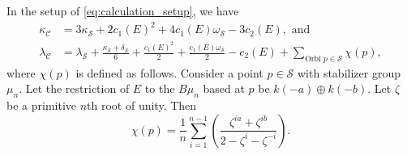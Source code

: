 \documentclass{amsart}
\newcommand{\orb}[1]{{\mathcal #1}}     %
\begin{document}
\begin{proposition}\label{thm:kappa-lambda}
  In the setup of \eqref{eq:calculation_setup}, we have
\begin{align*}
    \kappa_{\orb C} &= 3\kappa_{\orb S}+ 2c_1(E)^2  + 4c_1(E)\omega_{\orb S} - 3c_2(E), \text{ and }\\
\lambda_{\orb C} &= \lambda_{\orb S} + \frac{\kappa_{\orb S}+\delta_{\orb S}}{6} + \frac{c_1(E)^2}{2} + \frac{c_1(E)\omega_{\orb S}}{2} - c_2(E) + \sum_{\text{Orbi }p \in \orb S} \chi(p),
\end{align*}
where $\chi(p)$ is defined as follows. Consider a point $p \in \orb S$ with stabilizer group $\mu_n$. Let the restriction of $E$ to the $B\mu_n$ based at $p$ be $k(-a) \oplus k(-b)$. Let $\zeta$ be a primitive $n$th root of unity. Then
\[ \chi(p) = \frac{1}{n}\sum_{i=1}^{n-1}\left(\frac{\zeta^{ia}+\zeta^{ib}}{2-\zeta^i-\zeta^{-i}}\right).\]
\end{proposition}
\end{document}
